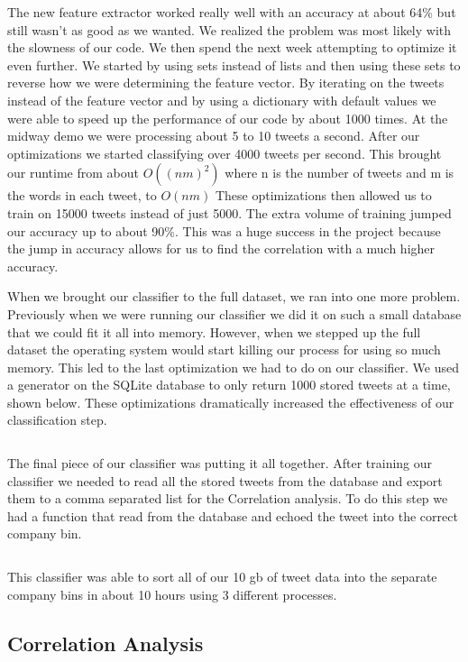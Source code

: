 \documentclass{acm_proc_article-sp}
\begin{document}
\break
\inputminted{python}{examples/train.py}

The new feature extractor worked really well with an accuracy at about 64\% but
still wasn't as good as we wanted. We realized the problem was most likely with
the slowness of our code. We then spend the next week attempting to optimize it
even further. We started by using sets instead of lists and then using these
sets to reverse how we were determining the feature vector. By iterating on the
tweets instead of the feature vector and by using a dictionary with default
values we were able to speed up the performance of our code by about 1000
times. At the midway demo we were processing about 5 to 10 tweets a second.
After our optimizations we started classifying over 4000 tweets per second.
This brought our runtime from about $O((nm)^2)$ where n is the number of tweets
and m is the words in each tweet, to $O(nm)$ These optimizations then allowed
us to train on 15000 tweets instead of just 5000. The extra volume of training
jumped our accuracy up to about 90\%. This was a huge success in the project
because the jump in accuracy allows for us to find the correlation with a much
higher accuracy. 

When we brought our classifier to the full dataset, we ran into one more
problem.  Previously when we were running our classifier we did it on such a
small database that we could fit it all into memory. However, when we stepped
up the full dataset the operating system would start killing our process
for using so much memory. This led to the last optimization we had to do on our
classifier. We used a generator on the SQLite database to only return 1000
stored tweets at a time, shown below. These optimizations dramatically
increased the effectiveness of our classification step.

\inputminted{python}{examples/generator.py}

The final piece of our classifier was putting it all together. After training
our classifier we needed to read all the stored tweets from the database and
export them to a comma separated list for the Correlation analysis. To do this
step we had a function that read from the database and echoed the tweet into
the correct company bin.

\inputminted{python}{examples/converter.py}

This classifier was able to sort all of our 10 gb of tweet data into the
separate company bins in about 10 hours using 3 different processes. 

\subsection{Correlation Analysis}
\end{document}
